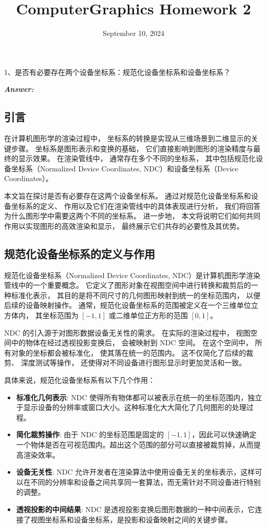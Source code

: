 \documentclass[12pt]{article}
\title{\textbf{ComputerGraphics Homework 2}}
\date{September 10, 2024}
\newenvironment{Answer}{
  \vspace{12pt}
  {\large\textbf{\textit{\hspace{-12pt}Answer:}}}\par
  \vspace{8pt}
} {\vspace{24pt}}
\begin{document}
\maketitle

\begin{question}{}{}
1、是否有必要存在两个设备坐标系：规范化设备坐标系和设备坐标系？
\end{question}
\begin{Answer}

\subsection*{引言}
\noindent

在计算机图形学的渲染过程中，
坐标系的转换是实现从三维场景到二维显示的关键步骤。
坐标系是图形表示和变换的基础，
它们直接影响到图形的渲染精度与最终的显示效果。
在渲染管线中，
通常存在多个不同的坐标系，
其中包括规范化设备坐标系（Normalized Device Coordinates, NDC）和设备坐标系（Device Coordinates）。

本文旨在探讨是否有必要存在这两个设备坐标系。
通过对规范化设备坐标系和设备坐标系的定义、
作用以及它们在渲染管线中的具体表现进行分析，
我们将回答为什么图形学中需要这两个不同的坐标系。
进一步地，
本文将说明它们如何共同作用以实现图形的高效渲染和显示，
最终展示它们共存的必要性及其优势。

\subsection*{规范化设备坐标系的定义与作用}
\noindent

规范化设备坐标系（Normalized Device Coordinates, NDC）是计算机图形学渲染管线中的一个重要概念。
它定义了图形对象在视图空间中进行转换和裁剪后的一种标准化表示，
其目的是将不同尺寸的几何图形映射到统一的坐标范围内，
以便后续的设备映射操作。
通常，规范化设备坐标系的范围被定义在一个三维单位立方体内，
其坐标范围为 $[-1, 1]$ 或二维单位正方形的范围 $[0, 1]$。

NDC 的引入源于对图形数据设备无关性的需求。
在实际的渲染过程中，
视图空间中的物体在经过透视投影变换后，
会被映射到 NDC 空间。
在这个空间中，
所有对象的坐标都会被标准化，
使其落在统一的范围内。
这不仅简化了后续的裁剪、
深度测试等操作，
还使得对不同设备进行图形显示时更加灵活和一致。

具体来说，规范化设备坐标系有以下几个作用：
\begin{itemize}
    \item \textbf{标准化几何表示}: NDC 使得所有物体都可以被表示在统一的坐标范围内，独立于显示设备的分辨率或窗口大小。这种标准化大大简化了几何图形的处理过程。
    \item \textbf{简化裁剪操作}: 由于 NDC 的坐标范围是固定的 $[-1, 1]$，因此可以快速确定一个物体是否在可视范围内。超出这个范围的部分可以直接被裁剪掉，从而提高渲染效率。
    \item \textbf{设备无关性}: NDC 允许开发者在渲染算法中使用设备无关的坐标表示，这样可以在不同的分辨率和设备之间共享同一套算法，而无需针对不同设备进行特别的调整。
    \item \textbf{透视投影的中间结果}: NDC 是透视投影变换后图形数据的一种中间表示，它连接了视图坐标系和设备坐标系，是投影和设备映射之间的关键步骤。
\end{itemize}


\end{Answer}
\end{document}
